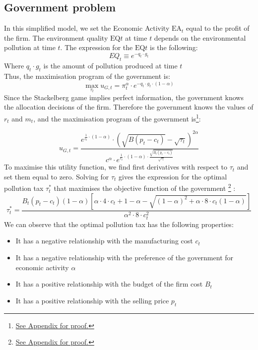 \documentclass{article}
\begin{document}
\subsection{Government problem}
In this simplified model, we set the Economic Activity $\text{EA}_{t}$ equal to the profit of the firm.
The environment quality $\text{EQ}{t}$ at time $t$ depends on the environmental pollution at time $t$. The expression for the $\text{EQ}{t}$ is the following: 
\begin{equation}
    EQ_{t}\equiv e^{-q_{t}\cdot g_{t}}
\end{equation}
Where $q_{t}\cdot g_{t}$ is the amount of pollution produced at time $t$ \\
Thus, the maximisation program of the government is: 
\begin{equation*}
    \max_{\tau_{t}}{u_{G,t}=\pi_{t}^{\alpha}\cdot e^{-q_{t}\cdot g_{t}\cdot(1-\alpha)}}
\end{equation*}
Since the Stackelberg game implies perfect information, the government knows the allocation decisions of the firm. Therefore  the government knows the values of $r_{t}$ and $m_{t}$, and the maximisation program of the government is\footnote{\hyperref[sec:proof6]{See Appendix for proof.}}: 

\begin{equation}
    u_{G,t}=\frac{e^{\frac{1}{c_{t}}\cdot\left(1-\alpha\right)}\cdot\left(\sqrt{B(p_{t}-c_{t})}-\sqrt{\tau_{t}}\right)^{2\alpha}}{c^{\alpha}\cdot e^{\frac{1}{c_{t}}\cdot(1-\alpha)\cdot\frac{\sqrt{B_{t}(p_{t}-c_{t})}}{\sqrt{\tau_{t}}}}}
\end{equation}
To maximise this utility function, we find first derivatives with respect to $\tau_{t}$ and set them equal to zero. Solving for $\tau_{t}$ gives the expression for the optimal pollution tax $\tau_{t}^{*}$ that maximises the objective function of the government \footnote{\hyperref[sec:proof7]{See Appendix for proof.}} : 
\begin{equation}
    \tau_{t}^{*}=\frac{B_{t}\left(p_{t}-c_{t}\right)(1-\alpha)\left[{\alpha \cdot 4\cdot c_{t}+1-\alpha}-\sqrt{(1-\alpha)^{2}+\alpha\cdot8\cdot c_{t}(1-\alpha)}\right]} {\alpha^{2} \cdot 8\cdot c_{t}^{2}}
\end{equation}
We can observe that the optimal pollution tax has the following properties: 
\begin{itemize}
    \item It has a negative relationship with the manufacturing cost $c_{t}$
    \item It has a negative relationship with the preference of the government for economic activity $\alpha$
    \item It has a positive relationship with the budget of the firm cost $B_{t}$
    \item It has a positive relationship with the selling price $p_{t}$
\end{itemize}
\end{document}
